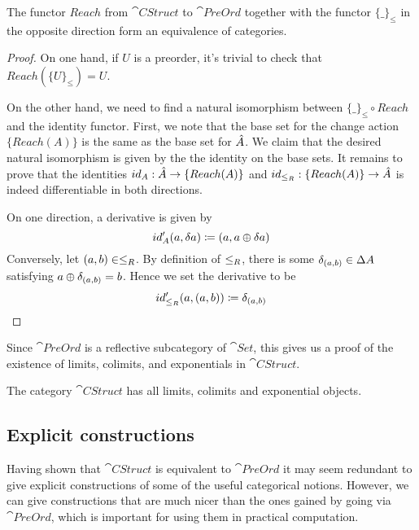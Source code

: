 \begin{thm}
  The functor $Reach$ from $\cat{CStruct}$ to $\cat{PreOrd}$ together with the 
  functor $\{\_\}_\leq$ in the opposite direction form an equivalence of categories.
\end{thm}
\ifproofs
\begin{proof}
  On one hand, if $U$ is a preorder, it's trivial to check that $Reach (\{U\}_\leq) = U$.

  On the other hand, we need to find a natural isomorphism between $\{\_\}_\leq \circ Reach$
  and the identity functor. First, we note that the base set for the change action $\{Reach(A)\}$ is
  the same as the base set for $\hat{A}$. We claim that the desired natural isomorphism is given by the
  the identity on the base sets. It remains to prove that the identities
  $id_A : \hat{A} \rightarrow \{Reach(A)\}$ and $id_{\leq_R} : \{Reach(A)\} \rightarrow \hat{A}$
  is indeed differentiable in both directions.

  On one direction, a derivative is given by
  $$
    id'_A(a, \delta a) \coloneqq (a, a \oplus \delta a)
  $$
  Conversely, let $(a, b) \in \leq_R$. By definition of $\leq_R$, there is some
  $\delta_{(a, b)} \in \Delta A$ satisfying $a \oplus \delta_{(a,b)} = b$. Hence we set the
  derivative to be
  $$
    id'_{\leq_R}(a, (a, b)) \coloneqq \delta_{(a, b)}
  $$
\end{proof}
\fi

Since $\cat{PreOrd}$ is a reflective subcategory of $\cat{Set}$, this gives us a proof
of the existence of limits, colimits, and exponentials in $\cat{CStruct}$.

\begin{corollary}
  The category $\cat{CStruct}$ has all limits, colimits and exponential objects. 
\end{corollary}

\subsection{Explicit constructions}

Having shown that $\cat{CStruct}$ is equivalent to $\cat{PreOrd}$ it may seem
redundant to give explicit constructions of some of the useful categorical
notions. However, we can give constructions that are much nicer than the ones
gained by going via $\cat{PreOrd}$, which is important for using them in
practical computation.


